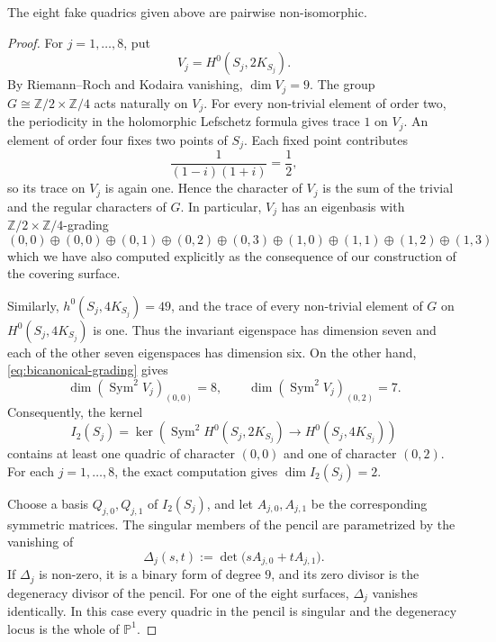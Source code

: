 \documentclass[10pt,a4paper]{amsart}
\begin{document}
\begin{theorem}
The eight fake quadrics given above are pairwise non-isomorphic.
\end{theorem}

\begin{proof}
For \(j=1,\ldots,8\), put
\[
        V_j=H^0(S_j,2K_{S_j}).
\]
By Riemann--Roch and Kodaira vanishing, \(\dim V_j=9\). The group
\(G\cong\mathbb Z/2\times\mathbb Z/4\) acts naturally on \(V_j\). For
every non-trivial element of order two, the periodicity in the
holomorphic Lefschetz formula gives trace $1$ on \(V_j\). An element of
order four fixes two points of \(S_j\). Each fixed point contributes
\[
        \frac{1}{(1-i)(1+i)}=\frac12,
\]
so its trace on \(V_j\) is again one. Hence the character of \(V_j\) is
the sum of the trivial and the regular characters of \(G\). In particular,
\(V_j\) has an eigenbasis with
\(\mathbb Z/2\times\mathbb Z/4\)-grading
\begin{equation}
 (0,0)\oplus(0,0)\oplus(0,1)\oplus(0,2)\oplus(0,3)
 \oplus(1,0)\oplus(1,1)\oplus(1,2)\oplus(1,3)
 \label{eq:bicanonical-grading}
\end{equation}
which we have also computed explicitly as the consequence of our construction of the covering surface.

Similarly, \(h^0(S_j,4K_{S_j})=49\), and the trace of every non-trivial
element of \(G\) on \(H^0(S_j,4K_{S_j})\) is one. Thus the invariant
eigenspace has dimension seven and each of the other seven eigenspaces
has dimension six. On the other hand,
\eqref{eq:bicanonical-grading} gives
\[
 \dim\!\left(\operatorname{Sym}^2V_j\right)_{(0,0)}=8,
 \qquad
 \dim\!\left(\operatorname{Sym}^2V_j\right)_{(0,2)}=7.
\]
Consequently, the kernel
\[
 I_2(S_j)=\ker\!\left(
   \operatorname{Sym}^2H^0(S_j,2K_{S_j})
   \longrightarrow H^0(S_j,4K_{S_j})
 \right)
\]
contains at least one quadric of character \((0,0)\) and one of
character \((0,2)\). For each \(j=1,\ldots,8\), the exact computation
gives
\(
        \dim I_2(S_j)=2.
\)

Choose a basis \(Q_{j,0},Q_{j,1}\) of \(I_2(S_j)\), and let
\(A_{j,0},A_{j,1}\) be the corresponding symmetric matrices. The
singular members of the pencil are parametrized by the vanishing of
\[
        \Delta_j(s,t)
        :=\det\bigl(sA_{j,0}+tA_{j,1}\bigr).
\]
If \(\Delta_j\) is non-zero, it is a binary form of degree \(9\), and
its zero divisor is the degeneracy divisor of the pencil. For one of
the eight surfaces, \(\Delta_j\) vanishes identically. In this case
every quadric in the pencil is singular and the degeneracy locus is the
whole of \(\mathbb P^1\).


\end{proof}
\end{document}
